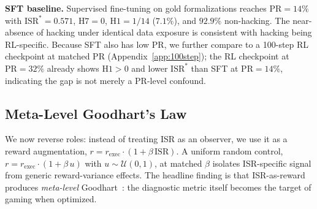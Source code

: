 \textbf{SFT baseline.}
Supervised fine-tuning on gold formalizations reaches $\text{PR}{=}14\%$ with $\text{ISR}^{*}{=}0.571$, $\text{H7}{=}0$, $\text{H1}{=}1/14$ ($7.1\%$), and $92.9\%$ non-hacking. %
The near-absence of hacking under identical data exposure is consistent with hacking being RL-specific.
Because SFT also has low PR, we further compare to a 100-step RL checkpoint at matched PR (Appendix~\ref{app:100step}); the RL checkpoint at $\text{PR}{=}32\%$ already shows $\text{H1}{>}0$ and lower $\text{ISR}^*$ than SFT at $\text{PR}{=}14\%$, indicating the gap is not merely a PR-level confound.

\subsection{Meta-Level Goodhart's Law}
\label{sec:goodhart}

We now reverse roles: instead of treating ISR as an observer, we use it as a reward augmentation, $r = r_{\text{exec}}\cdot(1 + \beta\,\text{ISR})$.
A uniform random control, $r = r_{\text{exec}}\cdot(1 + \beta\,u)$ with $u\sim\mathcal{U}(0,1)$, at matched $\beta$ isolates ISR-specific signal from generic reward-variance effects.
The headline finding is that ISR-as-reward produces \emph{meta-level} Goodhart~\citep{manheim-goodhart-taxonomy}: the diagnostic metric itself becomes the target of gaming when optimized.


